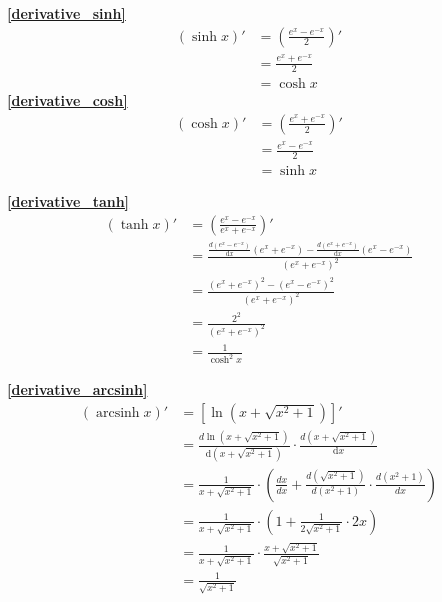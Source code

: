 \textbf{\large \ref{derivative_sinh}}
\begin{displaymath}
    \begin{split}
        (\sinh x)'&=\left(\frac{e^x-e^{-x}}{2}\right)'\\
                                    &=\frac{e^x+e^{-x}}{2}\\
                                    &=\cosh x
    \end{split}
\end{displaymath}
\textbf{\large \ref{derivative_cosh}}
\begin{displaymath}
    \begin{split}
        (\cosh x)'&=\left(\frac{e^x+e^{-x}}{2}\right)'\\
                                    &=\frac{e^x-e^{-x}}{2}\\
                                    &=\sinh x
    \end{split}
\end{displaymath}

\textbf{\large \ref{derivative_tanh}}
\begin{displaymath}
    \begin{split}
        (\tanh x)'&=\left(\frac{e^x-e^{-x}}{e^x+e^{-x}}\right)'\\
                                    &=\frac{\frac{d(e^x-e^{-x})}{\mathrm{d}{x}}(e^x+e^{-x})-\frac{d(e^x+e^{-x})}{\mathrm{d}{x}}(e^x-e^{-x})}{\left(e^x+e^{-x}\right)^2}\\
                                    &=\frac{\left(e^x+e^{-x}\right)^2-\left(e^x-e^{-x}\right)^2}{\left(e^x+e^{-x}\right)^2}\\
                                    &=\frac{2^2}{\left(e^x+e^{-x}\right)^2}\\
                                    &=\frac{1}{\cosh^2 x}
                                \end{split}
\end{displaymath}

\textbf{\large \ref{derivative_arcsinh}}
\begin{displaymath}
    \begin{split}
        (\operatorname{arcsinh}{x})' &=\left[\ln(x+\sqrt{x^2+1})\right]'\\
                                    &=\frac{d \ln(x+\sqrt{x^2+1})}{\mathrm{d}{\left(x+\sqrt{x^2+1}\right)}}\cdot\frac{d \left(x+\sqrt{x^2+1}\right)}{\mathrm{d}{x}}\\
                                    &=\frac{1}{x+\sqrt{x^2+1}}\cdot\left(\frac{dx}{dx}+\frac{d \left(\sqrt{x^2+1}\right)}{d\left(x^2+1\right)}\cdot\frac{d(x^2+1)}{dx}\right)\\
                                    &=\frac{1}{x+\sqrt{x^2+1}}\cdot\left(1+\frac{1}{2\sqrt{x^2+1}}\cdot 2x\right)\\                                    
                                    &=\frac{1}{x+\sqrt{x^2+1}}\cdot\frac{x+\sqrt{x^2+1}}{\sqrt{x^2+1}}\\
                                    &=\frac{1}{\sqrt{x^2+1}}
                                \end{split}
\end{displaymath}

